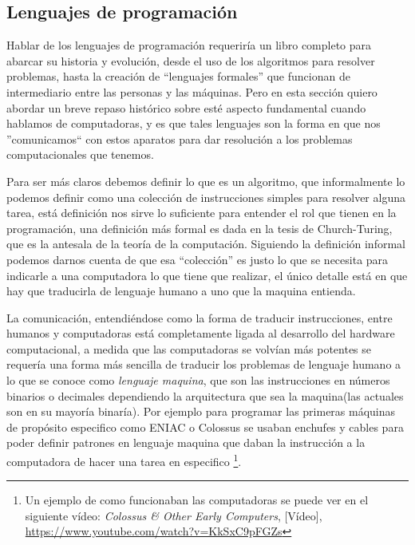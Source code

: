 \documentclass[letterpaper,12pt,oneside]{book}
\begin{document}
		
		\clearpage
		\subsection{Lenguajes de programación}
		
		Hablar de los lenguajes de programación requeriría un libro completo para abarcar su historia y evolución, desde el uso de los algoritmos
		para resolver problemas, hasta la creación de ``lenguajes formales'' que funcionan de intermediario entre las personas y las máquinas. Pero
		en esta sección quiero abordar un breve repaso histórico sobre esté aspecto fundamental cuando hablamos de computadoras, y es que tales lenguajes
		son la forma en que nos ''comunicamos`` con estos aparatos para dar resolución a los problemas computacionales que tenemos.
		
		Para ser más claros debemos definir lo que es un algoritmo, que informalmente lo podemos definir como una colección de instrucciones simples para
		resolver alguna tarea, está definición nos sirve lo suficiente para entender el rol que tienen en la programación, una definición más formal es
		dada en la tesis de Church-Turing, que es la antesala de la teoría de la computación\cite{sipser_introduction_2013}. Siguiendo la definición informal
		podemos darnos cuenta de que esa ``colección'' es justo lo que se necesita para indicarle a una computadora lo que tiene que realizar, el único
		detalle está en que hay que traducirla de lenguaje humano a uno que la maquina entienda.
		
		La comunicación, entendiéndose como la forma de traducir instrucciones, entre humanos y computadoras está		
		completamente ligada al desarrollo del hardware computacional, a medida que las computadoras se volvían más potentes se requería
		una forma más sencilla de traducir los problemas de lenguaje humano a lo que se conoce como \textit{lenguaje maquina}, que son las instrucciones en números
		binarios o decimales dependiendo la arquitectura que sea la maquina(las actuales son en su mayoría binaría). Por ejemplo para programar las primeras máquinas
		de propósito especifico como ENIAC o Colossus se usaban enchufes y cables para poder definir patrones en lenguaje maquina que daban la instrucción a la computadora de 	
		hacer una tarea en especifico\cite[p. 8]{tanenbaum_modern_2002} \footnote{Un ejemplo de como funcionaban las computadoras se puede ver en el siguiente vídeo: \emph{ 
		Colossus \& Other Early Computers}, [Vídeo], \url{https://www.youtube.com/watch?v=KkSxC9pFGZs} }. 
		
\end{document}
